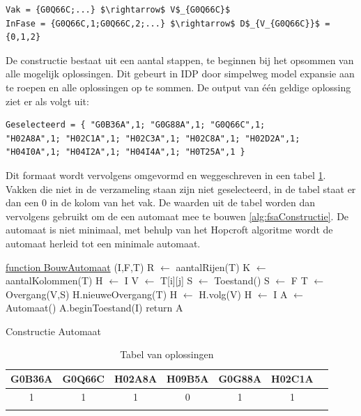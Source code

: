 \begin{lstlisting}[mathescape, caption=IDP Syntax conversion, frame=single]
Vak = {G0Q66C;...} $\rightarrow$ V$_{G0Q66C}$
InFase = {G0Q66C,1;G0Q66C,2;...} $\rightarrow$ D$_{V_{G0Q66C}}$ = {0,1,2}
\end{lstlisting}

De constructie bestaat uit een aantal stappen, te beginnen bij het opsommen van alle mogelijk oplossingen. Dit gebeurt in IDP door simpelweg model expansie aan te roepen en alle oplossingen op te sommen. De output van \'{e}\'{e}n geldige oplossing ziet er als volgt uit:
\begin{lstlisting}[mathescape, caption=IDP model, frame=single]
Geselecteerd = { "G0B36A",1; "G0G88A",1; "G0Q66C",1; 
"H02A8A",1; "H02C1A",1; "H02C3A",1; "H02C8A",1; "H02D2A",1;
"H04I0A",1; "H04I2A",1; "H04I4A",1; "H0T25A",1 }
\end{lstlisting}
Dit formaat wordt vervolgens omgevormd en weggeschreven in een tabel \ref{tab:oplossingen}. Vakken die niet in de verzameling staan zijn niet geselecteerd, in de tabel staat er dan een 0 in de kolom van het vak. De waarden uit de tabel worden dan vervolgens gebruikt om de een automaat mee te bouwen \ref{alg:fsaConstructie}. De automaat is niet minimaal, met behulp van het Hopcroft algoritme wordt de automaat herleid tot een minimale automaat. 

\begin{algorithm}
	\underline{function BouwAutomaat} (I,F,T)\;
	R $\leftarrow$ aantalRijen(T) \;
	K $\leftarrow$ aantalKolommen(T) \;
	H $\leftarrow$ I \;
		{
			{
			V $\leftarrow$ T[i][j] \;
				{
					{
					S $\leftarrow$ Toestand() \;
					}
					{
					S $\leftarrow$ F \;
					}
				T $\leftarrow$ Overgang(V,S) \;
				H.nieuweOvergang(T) \;
				}
			H $\leftarrow$ H.volg(V) \;
			}
		H $\leftarrow$ I \;
		}
	A $\leftarrow$ Automaat() \;
	A.beginToestand(I) \;
	return A \;
	\caption{Constructie Automaat\label{alg:fsaConstructie}}
\end{algorithm}

\begin{table}[]
\centering
\caption{Tabel van oplossingen}
\label{tab:oplossingen}
\begin{tabular}{|c|c|c|c|c|c|c}
\hline
G0B36A & G0Q66C & H02A8A & H09B5A & G0G88A & H02C1A &  \\ \hline
1 & 1 & 1 & 0 & 1 & 1 &  \\ \hline
 &  &  &  &  &  & 
\end{tabular}
\end{table}

